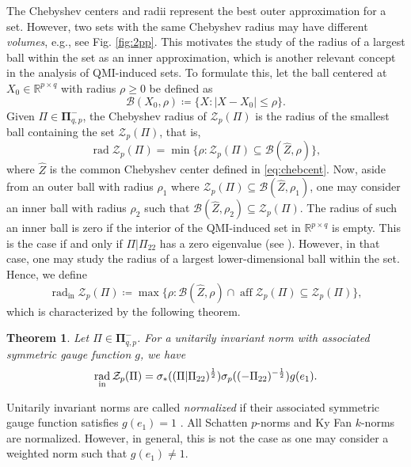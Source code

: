 \documentclass[pdflatex,sn-mathphys-num]{sn-jnl}%
\DeclareMathOperator{\rad}{rad}
\DeclareMathOperator{\aff}{aff}
\newcommand{\norm}[1]{\left|#1\right|}
\theoremstyle{thmstyleone}
\newtheorem{theorem}{Theorem}
\begin{document}
The Chebyshev centers and radii represent the best outer approximation for a set. However, two sets with the same Chebyshev radius may have different \emph{volumes}, e.g., see Fig. \ref{fig:2pp}. This motivates the study of the radius of a largest ball within the set as an inner approximation, which is another relevant concept in the analysis of QMI-induced sets. To formulate this, let the ball centered at $X_0\in\mathbb{R}^{p\times q}$ with radius $\rho\geq0$ be defined as
\begin{equation}
\mathcal{B}(X_0,\rho)\coloneqq\{X:\norm{X-X_0}\leq \rho\}.
\end{equation}
Given $\Pi\in\pmb{\Pi}_{q,p}^-$, the Chebyshev radius of $\mathcal{Z}_p(\Pi)$ is the radius of the smallest ball containing the set $\mathcal{Z}_p(\Pi)$, that is, 
\begin{equation}
\rad\mathcal{Z}_p(\Pi)=\min\{\rho:\mathcal{Z}_p(\Pi)\subseteq\mathcal{B}(\hat{Z},\rho)\},
\end{equation}
where $\hat{Z}$ is the common Chebyshev center defined in \eqref{eq:chebcent}. Now, aside from an outer ball with radius $\rho_1$ where $\mathcal{Z}_p(\Pi)\subseteq\mathcal{B}(\hat{Z},\rho_1)$, one may consider an inner ball with radius $\rho_2$ such that $\mathcal{B}(\hat{Z},\rho_2)\subseteq\mathcal{Z}_p(\Pi)$. The radius of such an inner ball is zero if the interior of the QMI-induced set in $\mathbb{R}^{p\times q}$ is empty. This is the case if and only if $\Pi|\Pi_{22}$ has a zero eigenvalue (see \cite[Thm. 3.2(c)]{van2023quadratic}). However, in that case, one may study the radius of a largest lower-dimensional ball within the set. Hence, we define
\begin{equation}
\rad_\text{in}\mathcal{Z}_p(\Pi)\coloneqq \max\{\rho:\mathcal{B}(\hat{Z},\rho)\cap\aff\mathcal{Z}_p(\Pi)\subseteq\mathcal{Z}_p(\Pi)\},
\end{equation}
which is characterized by the following theorem.

\begin{theorem}
\label{th:2}
Let $\Pi\in\pmb{\Pi}_{q,p}^-$. For a unitarily invariant norm with associated symmetric gauge function $g$, we have 
\begin{equation}
\rad_{\textup{in}}\mathcal{Z}_p(\Pi)=\sigma_*((\Pi|\Pi_{22})^{\frac{1}{2}})\sigma_p((-\Pi_{22})^{-\frac{1}{2}})g(e_1).
\end{equation}
\end{theorem}

Unitarily invariant norms are called \emph{normalized} if their associated symmetric gauge function satisfies $g(e_1)=1$ \cite{hiai2002inequalities}. All Schatten $p$-norms and Ky Fan $k$-norms are normalized. However, in general, this is not the case as one may consider a weighted norm such that $g(e_1)\neq1$. 
\end{document}
